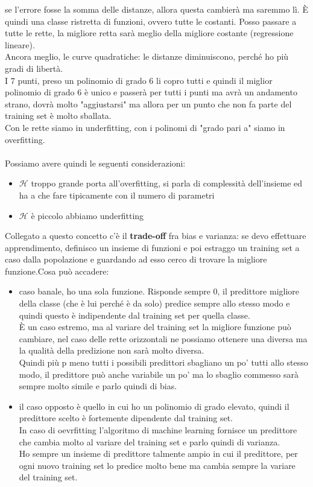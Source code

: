 \documentclass[12pt, oneside]{extbook}
\begin{document}
se l'errore fosse la somma delle distanze, allora questa cambierà ma saremmo lì. È quindi una classe ristretta di funzioni, ovvero tutte le costanti. Posso passare a tutte le rette, la migliore retta sarà meglio della migliore costante (regressione lineare).\\Ancora meglio, le curve quadratiche: le distanze diminuiscono, perché ho più gradi di libertà.\\I 7 punti, preso un polinomio di grado 6 li copro tutti e quindi il miglior polinomio di grado 6 è unico e passerà per tutti i punti ma avrà un andamento strano, dovrà molto "aggiustarsi" ma allora per un punto che non fa parte del training set è molto sballata.\\Con le rette siamo in underfitting, con i polinomi di "grado pari a" siamo in overfitting.\\\\Possiamo avere quindi le seguenti considerazioni:
\begin{itemize}
	\item $\mathscr{H}$ troppo grande porta all'overfitting, si parla di complessità dell'insieme ed ha a che fare tipicamente con il numero di parametri
	\item $\mathscr{H}$ è piccolo abbiamo underfitting
\end{itemize}
Collegato a questo concetto c'è il \textbf{trade-off} fra bias e varianza: se devo effettuare apprendimento, definisco un insieme di funzioni e poi estraggo un training set a caso dalla popolazione e guardando ad esso cerco di trovare la migliore funzione.Cosa può accadere:
\begin{itemize}
	\item caso banale, ho una sola funzione. Risponde sempre 0, il predittore migliore della classe (che è lui perché è da solo) predice sempre allo stesso modo e quindi questo è indipendente dal training set per quella classe.\\È un caso estremo, ma al variare del training set la migliore funzione può cambiare, nel caso delle rette orizzontali ne possiamo ottenere una diversa ma la qualità della predizione non sarà molto diversa.\\Quindi più p meno tutti i possibili predittori sbagliano un po' tutti allo stesso modo, il predittore può anche variabile un po' ma lo sbaglio commesso sarà sempre molto simile e parlo quindi di bias.
	\item il caso opposto è quello in cui ho un polinomio di grado elevato, quindi il predittore scelto è fortemente dipendente dal training set.\\In caso di oevrfitting l'algoritmo di machine learning fornisce un predittore che cambia molto al variare del training set e parlo quindi di varianza.\\Ho sempre un insieme di predittore talmente ampio in cui il predittore, per ogni nuovo training set lo predice molto bene ma cambia sempre la variare del training set.
\end{itemize}
\end{document}

